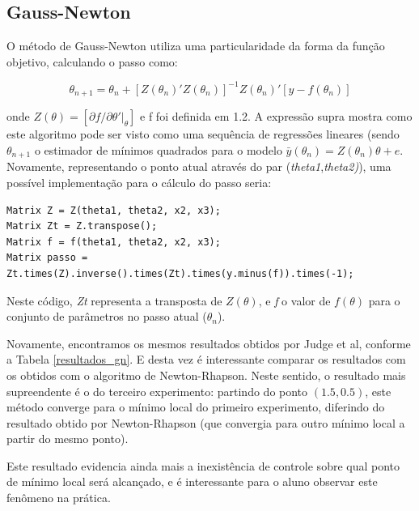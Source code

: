 \documentclass{abnt}
\newenvironment{mylisting}
{\begin{list}{}{\setlength{\leftmargin}{1em}}\item\scriptsize\bfseries}
{\end{list}}
\begin{document}
\subsection{Gauss-Newton}

	O método de Gauss-Newton utiliza uma particularidade da forma da função objetivo, calculando o passo como:

\[ \theta_{n+1} = \theta_{n} + [Z(\theta_n)'Z(\theta_n)]^{-1}Z(\theta_n)'[y-f(\theta_n)] \]

		onde $Z(\theta)=[\partial f/ \partial \theta'\vert_{\theta}]$ e f foi definida em 1.2. A expressão supra  mostra como este algoritmo pode ser visto como uma sequência de regressões lineares (sendo $\theta_{n+1}$ o estimador de mínimos quadrados para o modelo $\bar y(\theta_{n})=Z(\theta_{n})\theta + e$. Novamente, representando o ponto atual através do par (\textit{theta1},\textit{theta2)}), uma possível implementação para o cálculo do passo seria:

\begin{mylisting}
\begin{verbatim}
Matrix Z = Z(theta1, theta2, x2, x3); 
Matrix Zt = Z.transpose(); 
Matrix f = f(theta1, theta2, x2, x3); 
Matrix passo = Zt.times(Z).inverse().times(Zt).times(y.minus(f)).times(-1); 
\end{verbatim}
\end{mylisting}

Neste código, \textit{Zt} representa a transposta de $Z(\theta)$, e \textit{f} o valor de $f(\theta)$ para o conjunto de parâmetros no passo atual ($\theta_n$).

Novamente, encontramos os mesmos resultados obtidos por Judge et al, conforme a Tabela \ref{resultados_gn}. E desta vez é interessante comparar os resultados com os obtidos com o algoritmo de Newton-Rhapson. Neste sentido, o resultado mais supreendente é o do terceiro experimento: partindo do ponto $(1.5, 0.5)$, este método converge para o mínimo local do primeiro experimento, diferindo do resultado obtido por Newton-Rhapson (que convergia para outro mínimo local a partir do mesmo ponto).

Este resultado evidencia ainda mais a inexistência de controle sobre qual ponto de mínimo local será alcançado, e é interessante para o aluno observar este fenômeno na prática.
\end{document}
